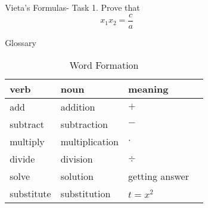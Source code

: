 \documentclass[final]{beamer}
\newlength{\sepwid}
\newlength{\onecolwid}
\newlength{\twocolwid}
\begin{document}
\begin{frame}[t]
\begin{columns}[t]
\begin{column}{\twocolwid}
\end{column} %

\begin{column}{\sepwid}\end{column} %

\begin{column}{\onecolwid} %


\begin{block}{Vieta's Formulas- Task}
1. Prove that $$x_1x_2 = \frac{c}{a}$$
\[\]
\[\]
\[\]
\[\]
\[\]

\end{block}




\begin{block}{Glossary}

\begin{table}
\vspace{2ex}
\begin{tabular}{l l l l}
\toprule
\textbf{verb} & \textbf{noun} & \textbf{meaning}\\
\midrule
add & addition & $+$ \\
subtract & subtraction & $-$ \\
multiply & multiplication & $\cdot$ \\
divide & division & $\div$ \\
solve & solution & getting answer \\
substitute & substitution & $t=x^2$ \\



\bottomrule
\end{tabular}
\caption{Word Formation}
\end{table}


\end{block}



\end{column}
\end{columns}
\end{frame}
\end{document}
